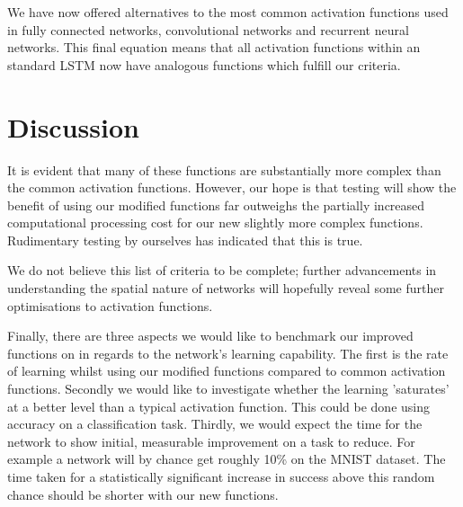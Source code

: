 \documentclass[onecolumn]{article}
\begin{document}
    We have now offered alternatives to the most common activation functions used in fully connected networks, convolutional networks and recurrent neural networks. This final equation means that all activation functions within an standard LSTM now have analogous functions which fulfill our criteria.
    \section{Discussion}
    It is evident that many of these functions are substantially more complex than the common activation functions. However, our hope is that testing will show the benefit of using our modified functions far outweighs the partially increased computational processing cost for our new slightly more complex functions. Rudimentary testing by ourselves has indicated that this is true.

    We do not believe this list of criteria to be complete; further advancements in understanding the spatial nature of networks will hopefully reveal some further optimisations to activation functions.

    Finally, there are three aspects we would like to benchmark our improved functions on in regards to the network's learning capability. The first is the rate of learning whilst using our modified functions compared to common activation functions. Secondly we would like to investigate whether the learning 'saturates' at a better level than a typical activation function. This could be done using accuracy on a classification task. Thirdly, we would expect the time for the network to show initial, measurable improvement on a task to reduce. For example a network will by chance get roughly 10\% on the MNIST dataset. The time taken for a statistically significant increase in success above this random chance should be shorter with our new functions.

\end{document}
